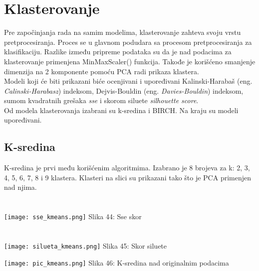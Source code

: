 \documentclass[a4paper]{article}
\begin{document}
{\section{Klasterovanje}
\label{klasterovanje}

Pre započinjanja rada na samim modelima, klasterovanje zahteva svoju vrstu pretprocesiranja. Proces se u glavnom podudara sa procesom pretprocesiranja za klasifikaciju. Razlike između pripreme podataka su da je nad podacima za klasterovanje primenjena MinMaxScaler() funkcija. Takođe je korišćeno smanjenje dimenzija na 2 komponente pomoću PCA radi prikaza klastera.\\

Modeli koji će biti prikazani biće ocenjivani i upoređivani Kalinski-Harabaš (eng. {\em Calinski-Harabasz}) indeksom, Dejvis-Bouldin (eng. {\em Davies-Bouldin}) indeksom, sumom kvadratnih grešaka {\em sse} i skorom siluete {\em silhouette score}.\\

Od modela klasterovanja izabrani su k-sredina i BIRCH. Na kraju su modeli upoređivani.\\

\subsection{K-sredina}
\label{rf}

\noindent\begin{minipage}{0.4\textwidth}
K-sredina je prvi među korišćenim algoritmima. Izabrano je 8 brojeva za k: 2, 3, 4, 5, 6, 7, 8 i 9 klastera. Klasteri na slici su prikazani tako što je PCA primenjen nad njima.\\
\vphantom{a}\\
\vphantom{a}\\
\texttt{[image: sse\_kmeans.png]}
\hphantom{aaaaaaaaa}Slika 44: Sse skor\\
\vphantom{a}\\
\vphantom{a}\\
\texttt{[image: silueta\_kmeans.png]}
\hphantom{aaaaaaaa}Slika 45: Skor siluete\\
\end{minipage}
\noindent\begin{minipage}{0.05\textwidth}
\hphantom{a}
\end{minipage}
\noindent\begin{minipage}{0.48\textwidth}
\texttt{[image: pic\_kmeans.png]}
Slika 46: K-sredina nad originalnim podacima\\
\end{minipage}

}
\end{document}
